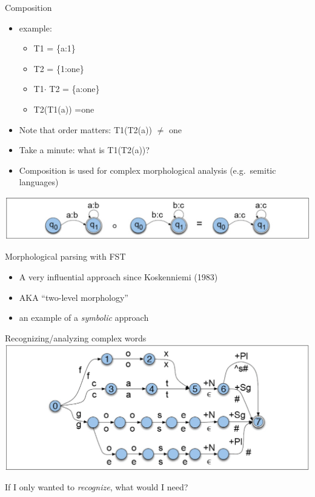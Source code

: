 \documentclass{beamer}
\begin{document}
\begin{frame}{Composition}
  \begin{itemize}
  \item example: 
    \begin{itemize}
    \item T1 = \{a:1\}
    \item T2 = \{1:one\} 
    \item T1$\cdot$ T2 = \{a:one\} 
    \item T2(T1(a)) =one
    \end{itemize}
  \item Note that order matters: T1(T2(a)) $\neq$ one
  \item Take a minute: what is T1(T2(a))?
  \item Composition is used for complex morphological analysis (e.g.\ semitic languages)
  \end{itemize}
  \includegraphics[width=\textwidth]{figures/3-9-composition}
\end{frame}


\begin{frame}{Morphological parsing with FST}
  \begin{itemize}
  \item A very influential approach since Koskenniemi (1983)
  \item AKA ``two-level morphology''
  \item an example of a {\it symbolic} approach
  \end{itemize}
\end{frame}

\begin{frame}{Recognizing/analyzing complex words}
  \includegraphics[width=\textwidth]{figures/3-14}

  If I only wanted to {\it recognize}, what would I need?
\end{frame}
\end{document}
